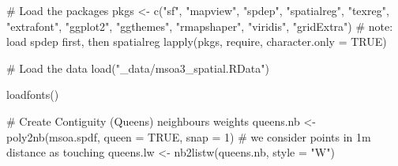 \documentclass[
  letterpaper,
]{scrbook}
\newenvironment{Shaded}{\begin{snugshade}}{\end{snugshade}}
\newcommand{\AttributeTok}[1]{\textcolor[rgb]{0.40,0.45,0.13}{#1}}
\newcommand{\CommentTok}[1]{\textcolor[rgb]{0.37,0.37,0.37}{#1}}
\newcommand{\ConstantTok}[1]{\textcolor[rgb]{0.56,0.35,0.01}{#1}}
\newcommand{\DecValTok}[1]{\textcolor[rgb]{0.68,0.00,0.00}{#1}}
\newcommand{\FunctionTok}[1]{\textcolor[rgb]{0.28,0.35,0.67}{#1}}
\newcommand{\NormalTok}[1]{\textcolor[rgb]{0.00,0.23,0.31}{#1}}
\newcommand{\OtherTok}[1]{\textcolor[rgb]{0.00,0.23,0.31}{#1}}
\newcommand{\StringTok}[1]{\textcolor[rgb]{0.13,0.47,0.30}{#1}}
\begin{document}
\begin{Shaded}
\begin{Highlighting}[]
\CommentTok{\# Load the packages}
\NormalTok{pkgs }\OtherTok{\textless{}{-}} \FunctionTok{c}\NormalTok{(}\StringTok{"sf"}\NormalTok{, }\StringTok{"mapview"}\NormalTok{, }\StringTok{"spdep"}\NormalTok{, }\StringTok{"spatialreg"}\NormalTok{, }\StringTok{"texreg"}\NormalTok{, }\StringTok{"extrafont"}\NormalTok{,}
          \StringTok{"ggplot2"}\NormalTok{, }\StringTok{"ggthemes"}\NormalTok{, }\StringTok{"rmapshaper"}\NormalTok{, }\StringTok{"viridis"}\NormalTok{, }\StringTok{"gridExtra"}\NormalTok{) }\CommentTok{\# note: load spdep first, then spatialreg}
\FunctionTok{lapply}\NormalTok{(pkgs, require, }\AttributeTok{character.only =} \ConstantTok{TRUE}\NormalTok{)}

\CommentTok{\# Load the data}
\FunctionTok{load}\NormalTok{(}\StringTok{"\_data/msoa3\_spatial.RData"}\NormalTok{)}

\FunctionTok{loadfonts}\NormalTok{()}

\CommentTok{\# Create Contiguity (Queens) neighbours weights}
\NormalTok{queens.nb }\OtherTok{\textless{}{-}} \FunctionTok{poly2nb}\NormalTok{(msoa.spdf, }
                     \AttributeTok{queen =} \ConstantTok{TRUE}\NormalTok{, }
                     \AttributeTok{snap =} \DecValTok{1}\NormalTok{) }\CommentTok{\# we consider points in 1m distance as \textquotesingle{}touching\textquotesingle{}}
\NormalTok{queens.lw }\OtherTok{\textless{}{-}} \FunctionTok{nb2listw}\NormalTok{(queens.nb,}
                      \AttributeTok{style =} \StringTok{"W"}\NormalTok{)}
\end{Highlighting}
\end{Shaded}
\end{document}

